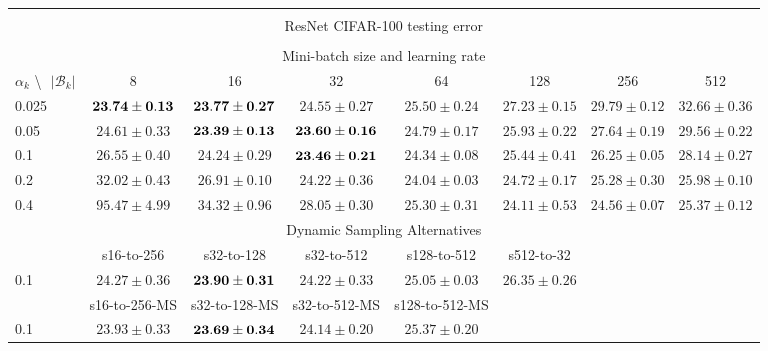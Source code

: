 \documentclass[10pt,journal,compsoc]{IEEEtran}
\begin{document}
\begin{table*}[!htbp]
\begin{center}
{\begin{tabular}{|l|c|c|c|c|c|c|c|}
\multicolumn{8}{|c|}{} \\
\multicolumn{8}{|c|}{ResNet CIFAR-100 testing error} \\
\multicolumn{8}{|c|}{} \\
\hline
\multicolumn{8}{|c|}{Mini-batch size and learning rate} \\
\hline
$\alpha_k$ \textbackslash $ \text{   } {|\mathcal{B}_k|}$ & 8 & 16 & 32 & 64 & 128 & 256 & 512 \\
\hline
0.025 & $\bf 23.74\pm0.13$ & $\bf 23.77\pm0.27$ & $24.55\pm0.27$ & $25.50\pm0.24$ & $27.23\pm0.15$ & $29.79\pm0.12$ & $32.66\pm0.36$ \\
\hline
0.05  & $24.61\pm0.33$ & $\bf 23.39\pm0.13$ & $\bf 23.60\pm0.16$ & $24.79\pm0.17$ & $25.93\pm0.22$ & $27.64\pm0.19$ & $29.56\pm0.22$ \\
\hline
0.1   & $26.55\pm0.40$ & $24.24\pm0.29$ & $\bf 23.46\pm0.21$ & $24.34\pm0.08$ & $25.44\pm0.41$ & $26.25\pm0.05$ & $28.14\pm0.27$ \\
\hline
0.2   & $32.02\pm0.43$ & $26.91\pm0.10$ & $24.22\pm0.36$ & $24.04\pm0.03$ & $24.72\pm0.17$ & $25.28\pm0.30$ & $25.98\pm0.10$ \\
\hline
0.4   & $95.47\pm4.99$ & $34.32\pm0.96$ & $28.05\pm0.30$ & $25.30\pm0.31$ & $24.11\pm0.53$ & $24.56\pm0.07$ & $25.37\pm0.12$ \\
\hline
\multicolumn{8}{|c|}{Dynamic Sampling Alternatives}\\
\hline
& s16-to-256  & s32-to-128 & s32-to-512 & s128-to-512 & s512-to-32 & &\\
\hline
0.1   & $24.27\pm0.36$ & $\bf 23.90\pm0.31$ & $24.22\pm0.33$ & $25.05\pm0.03$ & $26.35\pm0.26$  & &\\
\hline
& s16-to-256-MS & s32-to-128-MS & s32-to-512-MS & s128-to-512-MS & & &\\
\hline
0.1 & $23.93\pm0.33$ & $\bf 23.69\pm0.34$ &  $24.14\pm0.20$ & $25.37\pm0.20$ & & & \\
\hline
\end{tabular}}
\end{center}
\end{table*}
\end{document}
